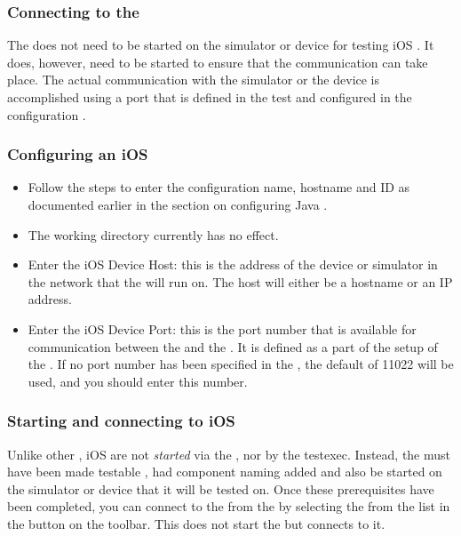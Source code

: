 
\subsubsection{Connecting to the \gdagent{}}
The \gdagent{} does not need to be started on the simulator or device for testing iOS \gdauts{}. It does, however, need to be started to ensure that the communication can take place.  The actual communication with the simulator or the device is accomplished using a port that is defined in the test \gdaut{}  and configured in the \gdaut{} configuration .


\subsubsection{Configuring an iOS \gdaut{}}
\label{TasksiOSAUTConfig}
\begin{itemize}
\item Follow the steps to enter the \gdaut{} configuration name, hostname and \gdaut{} ID as documented earlier in the section on configuring Java \gdauts{} .
\item The working directory currently has no effect.
\item Enter the iOS Device Host: this is the address of the device or simulator in the network that the \gdaut{} will run on. The host will either be a hostname or an IP address. 
\item Enter the iOS Device Port: this is the port number that is available for communication between the \gdaut{} and the \ite{}. It is defined as a part of the setup of the \gdaut{}. If no port number has been specified in the \gdaut{}, the default of 11022 will be used, and you should enter this number. 
\end{itemize}

\subsubsection{Starting and connecting to iOS \gdauts{}}
Unlike other \gdauts{}, iOS \gdauts{} are not \textit{started} via the \ite{}, nor by the testexec. Instead, the \gdaut{} must have been made testable , had component naming added  and also be started on the simulator or device that it will be tested on. 
Once these prerequisites have been completed, you can connect to the \gdaut{} from the \ite{} by selecting the \gdaut{} from the list in the  button on the toolbar. This does not start the \gdaut{} but connects to it. 

